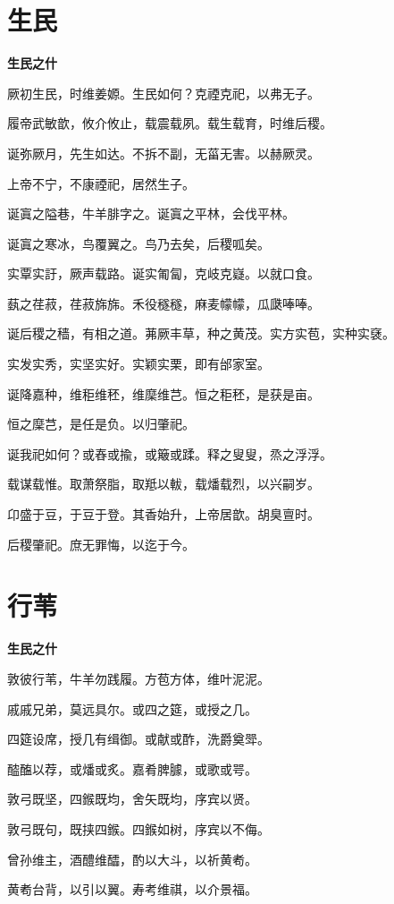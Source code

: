 \documentclass[12pt,a4paper]{ctexbook}
\begin{document}
\section{生民}
\textbf{生民之什}\par\vspace{0.5em}
厥初生民，时维姜嫄。生民如何？克禋克祀，以弗无子。\par
履帝武敏歆，攸介攸止，载震载夙。载生载育，时维后稷。\par
诞弥厥月，先生如达。不拆不副，无菑无害。以赫厥灵。\par
上帝不宁，不康禋祀，居然生子。\par
诞寘之隘巷，牛羊腓字之。诞寘之平林，会伐平林。\par
诞寘之寒冰，鸟覆翼之。鸟乃去矣，后稷呱矣。\par
实覃实訏，厥声载路。诞实匍匐，克岐克嶷。以就口食。\par
蓺之荏菽，荏菽旆旆。禾役穟穟，麻麦幪幪，瓜瓞唪唪。\par
诞后稷之穑，有相之道。茀厥丰草，种之黄茂。实方实苞，实种实褎。\par
实发实秀，实坚实好。实颖实栗，即有邰家室。\par
诞降嘉种，维秬维秠，维穈维芑。恒之秬秠，是获是亩。\par
恒之穈芑，是任是负。以归肇祀。\par
诞我祀如何？或舂或揄，或簸或蹂。释之叟叟，烝之浮浮。\par
载谋载惟。取萧祭脂，取羝以軷，载燔载烈，以兴嗣岁。\par
卬盛于豆，于豆于登。其香始升，上帝居歆。胡臭亶时。\par
后稷肇祀。庶无罪悔，以迄于今。\par

\section{行苇}
\textbf{生民之什}\par\vspace{0.5em}
敦彼行苇，牛羊勿践履。方苞方体，维叶泥泥。\par
戚戚兄弟，莫远具尔。或四之筵，或授之几。\par
四筵设席，授几有缉御。或献或酢，洗爵奠斝。\par
醓醢以荐，或燔或炙。嘉肴脾臄，或歌或咢。\par
敦弓既坚，四鍭既均，舍矢既均，序宾以贤。\par
敦弓既句，既挟四鍭。四鍭如树，序宾以不侮。\par
曾孙维主，酒醴维醽，酌以大斗，以祈黄耇。\par
黄耇台背，以引以翼。寿考维祺，以介景福。\par
\end{document}
